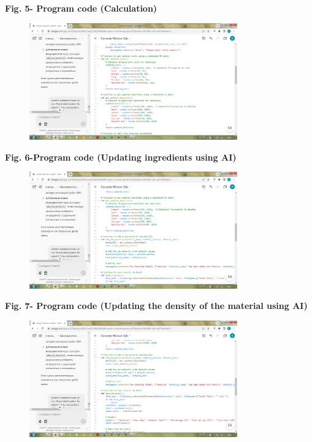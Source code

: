 {{\bfseries Fig. 5- Program code (Calculation)}

\begin{figure}[H]
	\centering
	\includegraphics[width=0.8\textwidth]{media/ict3/image7}
	\caption*{}
\end{figure}


{\bfseries Fig. 6-Program code (Updating ingredients using AI)}

\begin{figure}[H]
	\centering
	\includegraphics[width=0.8\textwidth]{media/ict3/image8}
	\caption*{}
\end{figure}


{\bfseries Fig. 7- Program code (Updating the density of the material using
AI)}

\begin{figure}[H]
	\centering
	\includegraphics[width=0.8\textwidth]{media/ict3/image9}
	\caption*{}
\end{figure}


}
